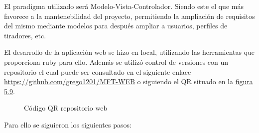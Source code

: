 El paradigma utilizado será Modelo-Vista-Controlador. Siendo este el que más
favorece a la mantenebilidad del proyecto, permitiendo la ampliación de requisitos
del mismo mediante modelos para después ampliar a usuarios, perfiles de tiradores,
etc.

El desarrollo de la aplicación web se hizo en local, utilizando las herramientas
que proporciona ruby para ello. Además se utilizó control de versiones con un repositorio
el cual puede ser consultado en el siguiente enlace \url{https://github.com/grego1201/MFT-WEB}
o siguiendo el QR situado en la \hyperref[fig:Código QR repositorio web]{figura 5.9}.

\begin{figure}[htb]
  \centering
  \caption[Código QR repositorio web]{Código QR repositorio web}
  \label{fig:Código QR repositorio web}
\end{figure}

Para ello se siguieron los siguientes pasos:

